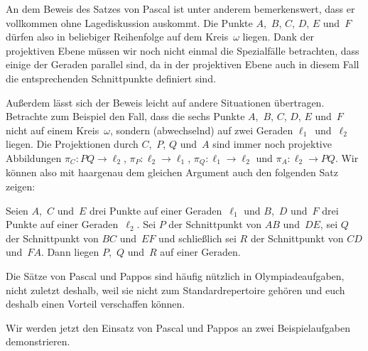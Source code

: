 An dem Beweis des Satzes von Pascal ist unter anderem bemerkenswert, dass er vollkommen ohne Lagediskussion auskommt. Die Punkte $A$,~$B$, $C$, $D$, $E$ und~$F$ dürfen also in beliebiger Reihenfolge auf dem Kreis~$\omega$ liegen. Dank der projektiven Ebene müssen wir noch nicht einmal die Spezialfälle betrachten, dass einige der Geraden parallel sind, da in der projektiven Ebene auch in diesem Fall die entsprechenden Schnittpunkte definiert sind.

Außerdem lässt sich der Beweis leicht auf andere Situationen übertragen. Betrachte zum Beispiel den Fall, dass die sechs Punkte $A$,~$B$, $C$, $D$, $E$ und~$F$ nicht auf einem Kreis~$\omega$, sondern (abwechselnd) auf zwei Geraden $\ell_1$~und~$\ell_2$ liegen. Die Projektionen durch $C$,~$P$, $Q$ und~$A$ sind immer noch projektive Abbildungen $\pi_C\colon PQ\to \ell_2$, $\pi_P\colon \ell_2\to \ell_1$, $\pi_Q\colon \ell_1\to\ell_2$ und $\pi_A\colon \ell_2\to PQ$. Wir können also mit haargenau dem gleichen Argument auch den folgenden Satz zeigen:

\begin{satzmitnamen}
	Seien $A$,~$C$ und~$E$ drei Punkte auf einer Geraden~$\ell_1$ und $B$,~$D$ und~$F$ drei Punkte auf einer Geraden~$\ell_2$. Sei $P$ der Schnittpunkt von $AB$ und~$DE$, sei $Q$ der Schnittpunkt von $BC$ und~$EF$ und schließlich sei $R$ der Schnittpunkt von $CD$ und~$FA$. Dann liegen $P$,~$Q$ und~$R$ auf einer Geraden.
\end{satzmitnamen}

Die Sätze von Pascal und Pappos sind häufig nützlich in Olympiadeaufgaben, nicht zuletzt deshalb, weil sie nicht zum Standardrepertoire gehören und euch deshalb einen Vorteil verschaffen können.

Wir werden jetzt den Einsatz von Pascal und Pappos an zwei Beispielaufgaben demonstrieren.

